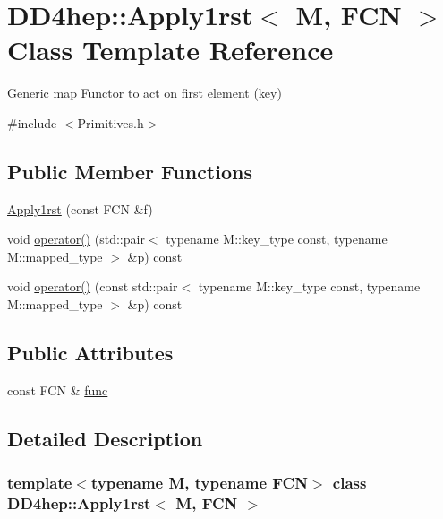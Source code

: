 \hypertarget{class_d_d4hep_1_1_apply1rst}{}\section{D\+D4hep\+:\+:Apply1rst$<$ M, F\+CN $>$ Class Template Reference}
\label{class_d_d4hep_1_1_apply1rst}


Generic map Functor to act on first element (key)  




{\ttfamily \#include $<$Primitives.\+h$>$}

\subsection*{Public Member Functions}
\begin{DoxyCompactItemize}
\item 
\hyperlink{class_d_d4hep_1_1_apply1rst_ace36b3412daa02454436d3a43abd5e63}{Apply1rst} (const F\+CN \&f)
\item 
void \hyperlink{class_d_d4hep_1_1_apply1rst_a7bfaf833503d87a6ceb99575debeef76}{operator()} (std\+::pair$<$ typename M\+::key\+\_\+type const, typename M\+::mapped\+\_\+type $>$ \&p) const
\item 
void \hyperlink{class_d_d4hep_1_1_apply1rst_a539dad6fe12c3e66ab194e30f49c356b}{operator()} (const std\+::pair$<$ typename M\+::key\+\_\+type const, typename M\+::mapped\+\_\+type $>$ \&p) const
\end{DoxyCompactItemize}
\subsection*{Public Attributes}
\begin{DoxyCompactItemize}
\item 
const F\+CN \& \hyperlink{class_d_d4hep_1_1_apply1rst_a3e6269941aac554118d47927dcdeba97}{func}
\end{DoxyCompactItemize}


\subsection{Detailed Description}
\subsubsection*{template$<$typename M, typename F\+CN$>$\newline
class D\+D4hep\+::\+Apply1rst$<$ M, F\+C\+N $>$}

